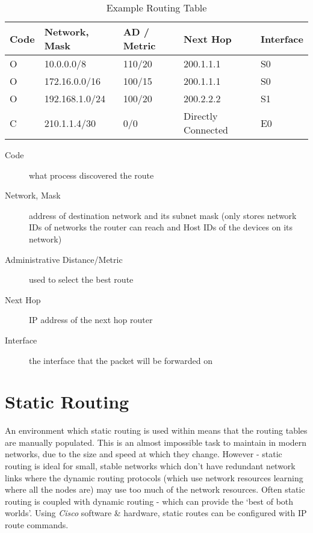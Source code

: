 \begin{table}[H]
    \centering
    {\RaggedRight
    \begin{tabular}{p{} p{} p{} p{} p{}}
    \textbf{Code} & \textbf{Network, Mask} & \textbf{AD / Metric} & \textbf{Next Hop} & \textbf{Interface}\\
    \hline
    \hline
    O & 10.0.0.0/8 & 110/20 & 200.1.1.1 & S0\\
    \hline
    O & 172.16.0.0/16 & 100/15 & 200.1.1.1 & S0\\
    \hline
    O & 192.168.1.0/24 & 100/20 & 200.2.2.2 & S1\\
    \hline
    C & 210.1.1.4/30 & 0/0 & Directly Connected & E0\\
    \hline
    \end{tabular}
    } %
    \caption{Example Routing Table}
\end{table}
\begin{description}
    \item[Code] what process discovered the route
    \item[Network, Mask] address of destination network and its subnet mask (only stores network IDs of networks the router can reach and Host IDs of the devices on its network)
    \item[Administrative Distance/Metric] used to select the best route
    \item[Next Hop] IP address of the next hop router
    \item[Interface] the interface that the packet will be forwarded on
\end{description}

\section{Static Routing}
An environment which static routing is used within means that the routing tables are manually populated. This is an almost impossible task to maintain in modern networks, due to the size and speed at which they change. However - static routing is ideal for small, stable networks which don't have redundant network links where the dynamic routing protocols (which use network resources learning where all the nodes are) may use too much of the network resources. Often static routing is coupled with dynamic routing - which can provide the `best of both worlds'. Using \textit{Cisco} software \& hardware, static routes can be configured with IP route commands.

